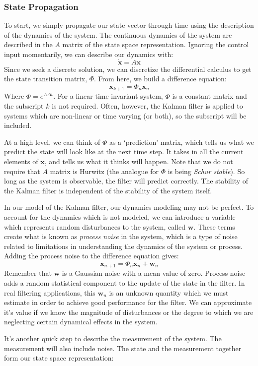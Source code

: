 \subsubsection{State Propagation}
To start, we simply propagate our state vector through time using the description of the dynamics of the system. The continuous dynamics of the system are described in the $A$ matrix of the state space representation. Ignoring the control input momentarily, we can describe our dynamics with:
$$\dot{\bm{x}}=A\bm{x}$$
Since we seek a discrete solution, we can discretize the differential calculus to get the state transition matrix, $\Phi$. From here, we build a difference equation:
$$\bm{x}_{k+1}=\Phi_{n}\bm{x}_{n}$$
Where $\Phi=e^{A\Delta t}$. For a linear time invariant system, $\Phi$ is a constant matrix and the subscript $k$ is not required. Often, however, the Kalman filter is applied to systems which are non-linear or time varying (or both), so the subscript will be included.

At a high level, we can think of $\Phi$ as a `prediction' matrix, which tells us what we predict the state will look like at the next time step. It takes in all the current elements of $\bm{x}$, and tells us what it thinks will happen. Note that we do not require that $A$ matrix is Hurwitz (the analogue for $\Phi$ is being \textit{Schur stable}). So long as the system is observable, the filter will predict correctly. The stability of the Kalman filter is independent of the stability of the system itself.
 
In our model of the Kalman filter, our dynamics modeling may not be perfect. To account for the dynamics which is not modeled, we can introduce a variable which represents random disturbances to the system, called $\bm{w}$. These terms create what is known as \textit{process noise} in the system, which is a type of noise related to limitations in understanding the dynamics of the system or process. Adding the process noise to the difference equation gives:
$$\bm{x}_{n+1}=\Phi_{n}\bm{x}_{n}+\bm{w}_{n}$$
Remember that $\bm{w}$ is a Gaussian noise with a mean value of zero. Process noise adds a random statistical component to the update of the state in the filter. In real filtering applications, this $\bm{w}_n$ is an unknown quantity which we must estimate in order to achieve good performance for the filter. We can approximate it's value if we know the magnitude of disturbances or the degree to which we are neglecting certain dynamical effects in the system.

It's another quick step to describe the measurement of the system. The measurement will also include noise. The state and the measurement together form our state space representation:

